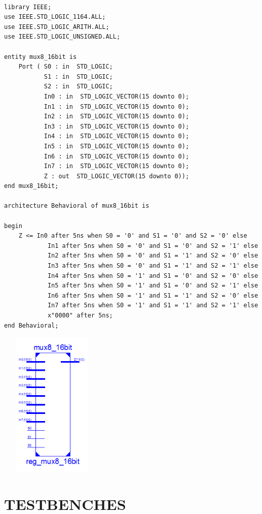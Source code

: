 \documentclass{article}
\begin{document}
\begin{lstlisting}

library IEEE;
use IEEE.STD_LOGIC_1164.ALL;
use IEEE.STD_LOGIC_ARITH.ALL;
use IEEE.STD_LOGIC_UNSIGNED.ALL;

entity mux8_16bit is
    Port ( S0 : in  STD_LOGIC;
           S1 : in  STD_LOGIC;
           S2 : in  STD_LOGIC;
           In0 : in  STD_LOGIC_VECTOR(15 downto 0);
           In1 : in  STD_LOGIC_VECTOR(15 downto 0);
           In2 : in  STD_LOGIC_VECTOR(15 downto 0);
           In3 : in  STD_LOGIC_VECTOR(15 downto 0);
           In4 : in  STD_LOGIC_VECTOR(15 downto 0);
           In5 : in  STD_LOGIC_VECTOR(15 downto 0);
           In6 : in  STD_LOGIC_VECTOR(15 downto 0);
           In7 : in  STD_LOGIC_VECTOR(15 downto 0);
           Z : out  STD_LOGIC_VECTOR(15 downto 0));
end mux8_16bit;

architecture Behavioral of mux8_16bit is

begin
	Z <= In0 after 5ns when S0 = '0' and S1 = '0' and S2 = '0' else 
			In1 after 5ns when S0 = '0' and S1 = '0' and S2 = '1' else 
			In2 after 5ns when S0 = '0' and S1 = '1' and S2 = '0' else 
			In3 after 5ns when S0 = '0' and S1 = '1' and S2 = '1' else
			In4 after 5ns when S0 = '1' and S1 = '0' and S2 = '0' else
			In5 after 5ns when S0 = '1' and S1 = '0' and S2 = '1' else
			In6 after 5ns when S0 = '1' and S1 = '1' and S2 = '0' else
			In7 after 5ns when S0 = '1' and S1 = '1' and S2 = '1' else
			x"0000" after 5ns;
end Behavioral;

\end{lstlisting}

\includegraphics[width=5cm, height=7cm]{mux8.png}






\pagebreak

\section{TESTBENCHES}
\end{document}
